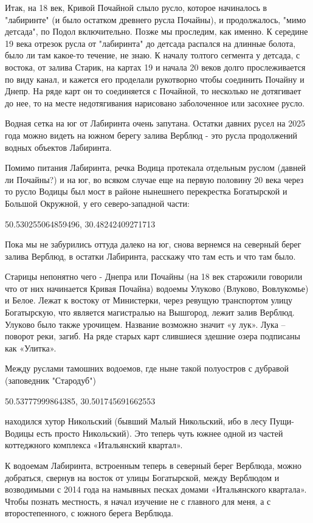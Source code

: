 Итак, на 18 век, Кривой Почайной слыло русло, которое начиналось в "лабиринте" (и было остатком древнего русла Почайны), и продолжалось, "мимо детсада", по Подол включительно. Позже мы проследим, как именно. К середине 19 века отрезок русла от "лабиринта" до детсада распался на длинные болота, было ли там какое-то течение, не знаю. К началу толтого сегмента у детсада, с востока, от залива Старик, на картах 19 и начала 20 веков долго прослеживается по виду канал, и кажется его проделали рукотворно чтобы соединить Почайну и Днепр. На ряде карт он то соединяется с Почайной, то несколько не дотягивает до нее, то на месте недотягивания нарисовано заболоченное или засохнее русло.

Водная сетка на юг от Лабиринта очень запутана. Остатки давних русел на 2025 года можно видеть на южном берегу залива Верблюд - это русла продолжений водных объектов Лабиринта.

Помимо питания Лабиринта, речка Водица протекала отдельным руслом (давней ли Почайны?) и на юг, во всяком случае еще на первую половину 20 века через то русло Водицы был мост в районе нынешнего перекрестка Богатырской и Большой Окружной, у его северо-западной части:

50.530255064859496, 30.48242409271713

Пока мы не забурились оттуда далеко на юг, снова вернемся на северный берег залива Верблюд, в остатки Лабиринта, расскажу что там есть и что там было.

Старицы непонятно чего - Днепра или Почайны (на 18 век старожили говорили что от них начинается Кривая Почайна) водоемы Улуково (Влуково, Вовлукомье) и Белое. Лежат к востоку от Министерки, через ревущую транспортом улицу Богатырскую, что является магистралью на Вышгород, лежит залив Верблюд. Улуково было также урочищем. Название возможно 
значит «у лук». Лука – поворот реки, загиб. 
На ряде старых карт слившиеся здешние озера подписаны как «Улитка».

Между руслами тамошних водоемов, где ныне такой полуостров с дубравой (заповедник "Стародуб")

50.53777999864385, 30.501745691662553

находился хутор Никольский (бывший Малый Никольский, ибо в лесу Пущи-Водицы есть просто Никольский). Это теперь чуть южнее одной из частей коттеджного комплекса «Итальянский квартал».

К водоемам Лабиринта, встроенным теперь в северный берег Верблюда, можно добраться, свернув на восток от улицы Богатырской, между Верблюдом и возводимыми с 2014 года на намывных песках домами «Итальянского квартала». Чтобы познать местность, я начал изучение не с главного для меня, а с второстепенного, с южного берега Верблюда.

